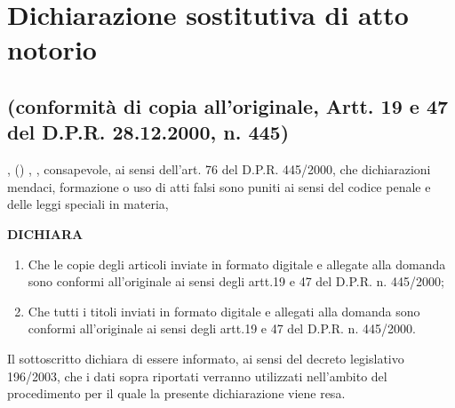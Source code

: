 \section*{Dichiarazione sostitutiva di atto notorio}
\subsection*{(conformità di copia all'originale, Artt. 19 e 47 del D.P.R. 28.12.2000, n. 445)}

\noindent \myTextField[.5cm]{}   ,  () , , consapevole, ai sensi dell’art. 76 del D.P.R. 445/2000, che
dichiarazioni mendaci, formazione o uso di atti falsi sono puniti ai sensi del codice penale e delle leggi speciali in materia,
\begin{center}
 \textbf{DICHIARA}
\end{center}
\begin{enumerate}
 \item Che le copie degli articoli inviate in formato digitale e allegate alla domanda sono conformi all’originale ai sensi degli artt.19 e 47 del D.P.R. n. 445/2000;
 \item Che tutti i titoli inviati in formato digitale e allegati alla domanda sono conformi all’originale ai sensi degli artt.19 e 47 del D.P.R. n. 445/2000.
\end{enumerate}
Il sottoscritto dichiara di essere informato, ai sensi del decreto legislativo 196/2003, che i dati sopra
riportati verranno utilizzati nell'ambito del procedimento per il quale la presente dichiarazione viene
resa.